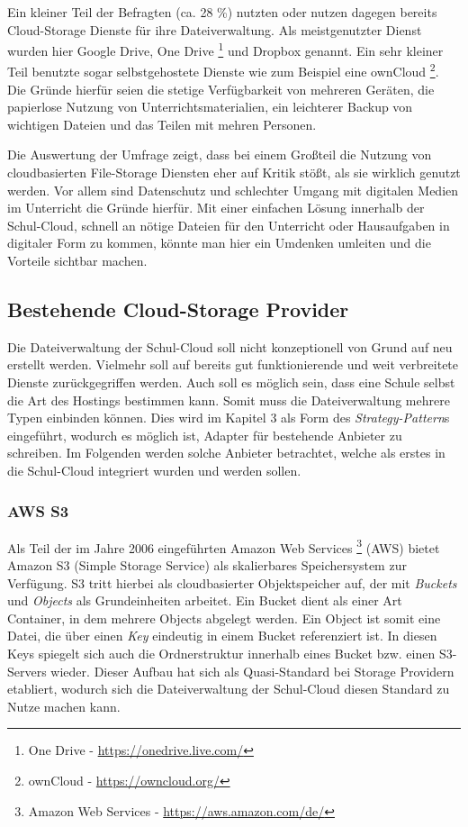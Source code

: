 Ein kleiner Teil der Befragten (ca. 28 \%) nutzten oder nutzen dagegen bereits Cloud-Storage Dienste für ihre Dateiverwaltung. Als meistgenutzter Dienst wurden hier Google Drive, One Drive  \footnote{One Drive - \url{https://onedrive.live.com/}} und Dropbox genannt. Ein sehr kleiner Teil benutzte sogar selbstgehostete Dienste wie zum Beispiel eine ownCloud \footnote{ownCloud - \url{https://owncloud.org/}}. Die Gründe hierfür seien die stetige Verfügbarkeit von mehreren Geräten, die papierlose Nutzung von Unterrichtsmaterialien, ein leichterer Backup von wichtigen Dateien und das Teilen mit mehren Personen. 

Die Auswertung der Umfrage zeigt, dass bei einem Großteil die Nutzung von cloudbasierten File-Storage Diensten eher auf Kritik stößt, als sie wirklich genutzt werden. Vor allem sind Datenschutz und schlechter Umgang mit digitalen Medien im Unterricht die Gründe hierfür. Mit einer einfachen Lösung innerhalb der Schul-Cloud, schnell an nötige Dateien für den Unterricht oder Hausaufgaben in digitaler Form zu kommen, könnte man hier ein Umdenken umleiten und die Vorteile sichtbar machen.

\subsection{Bestehende Cloud-Storage Provider}

Die Dateiverwaltung der Schul-Cloud soll nicht konzeptionell von Grund auf neu erstellt werden. Vielmehr soll auf bereits gut funktionierende und weit verbreitete Dienste zurückgegriffen werden. Auch soll es möglich sein, dass eine Schule selbst die Art des Hostings bestimmen kann. Somit muss die Dateiverwaltung mehrere Typen einbinden können. Dies wird im Kapitel 3 als Form des \textit{Strategy-Pattern}s eingeführt, wodurch es möglich ist, Adapter für bestehende Anbieter zu schreiben. Im Folgenden werden solche Anbieter betrachtet, welche als erstes in die Schul-Cloud integriert wurden und werden sollen.

\subsubsection{AWS S3}
\label{sec:awss3related}

Als Teil der im Jahre 2006 eingeführten Amazon Web Services \footnote{Amazon Web Services - \url{https://aws.amazon.com/de/}} (AWS) bietet Amazon S3 (Simple Storage Service) als skalierbares Speichersystem zur Verfügung. S3 tritt hierbei als cloudbasierter Objektspeicher auf, der mit \textit{Buckets} und \textit{Objects} als Grundeinheiten arbeitet. Ein Bucket dient als einer Art Container, in dem mehrere Objects abgelegt werden. Ein Object ist somit eine Datei, die über einen \textit{Key} eindeutig in einem Bucket referenziert ist. In diesen Keys spiegelt sich auch die Ordnerstruktur innerhalb eines Bucket bzw. einen S3-Servers wieder. Dieser Aufbau hat sich als Quasi-Standard bei Storage Providern etabliert, wodurch sich die Dateiverwaltung der Schul-Cloud diesen Standard zu Nutze machen kann.

